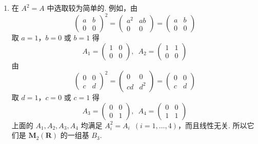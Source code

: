 \begin{enumerate}
\begin{enumerate}
              \item 在 $ A^2 = A $ 中选取较为简单的. 例如，由
                    \[ \begin{pmatrix} a & b \\ 0 & 0 \end{pmatrix}^2 = \begin{pmatrix} a^2 & ab \\ 0 & 0 \end{pmatrix} = \begin{pmatrix} a & b \\ 0 & 0 \end{pmatrix} \]
                    取 $ a = 1 $，$ b = 0 $ 或 $ b = 1 $ 得
                    \[ A_1 = \begin{pmatrix} 1 & 0 \\ 0 & 0 \end{pmatrix},\enspace A_2 = \begin{pmatrix} 1 & 1 \\ 0 & 0 \end{pmatrix} \]
                    由
                    \[ \begin{pmatrix} 0 & 0 \\ c & d \end{pmatrix}^2 = \begin{pmatrix} 0 & 0 \\ cd & d^2 \end{pmatrix} = \begin{pmatrix} 0 & 0 \\ c & d \end{pmatrix} \]
                    取 $ d = 1 $，$ c = 0 $ 或 $ c = 1 $ 得
                    \[ A_3 = \begin{pmatrix} 0 & 0 \\ 0 & 1 \end{pmatrix},\enspace A_4 = \begin{pmatrix} 0 & 0 \\ 1 & 1 \end{pmatrix} \]
                    上面的 $ A_1, A_2, A_3, A_4 $ 均满足 $ A_i^2 = A_i \enspace(i = 1, \ldots, 4) $，而且线性无关. 所以它们是 $ \mathbf{M}_2(\mathbf{R}) $ 的一组基 $ B_3 $.


\end{enumerate}
\end{enumerate}
